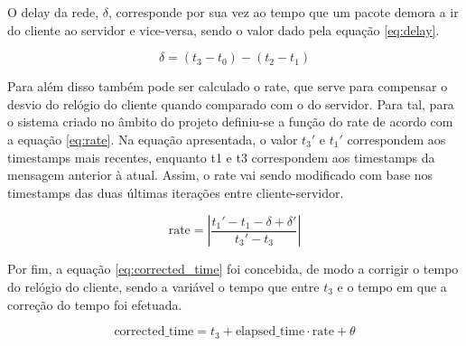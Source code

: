 O delay da rede, $\delta$, corresponde por sua vez ao tempo
que um pacote demora a ir do cliente ao servidor e vice-versa, sendo
o valor dado pela equação \ref{eq:delay}.


\begin{equation} \label{eq:delay}
\delta = (t_{\text{3}} - t_{\text{0}}) - (t_{\text{2}} - t_{\text{1}})
\end{equation}

Para além disso também pode ser calculado o rate, que serve
para compensar o desvio do relógio do cliente quando comparado com o do servidor.
Para tal, para o sistema criado no âmbito do projeto definiu-se a função do
rate de acordo com a equação \ref{eq:rate}. Na equação apresentada,
o valor $t_{\text{3}}'$ e $t_{\text{1}}'$ correspondem aos timestamps 
mais recentes, enquanto t1 e t3 correspondem aos timestamps da mensagem anterior à
atual. Assim, o rate vai sendo modificado com base nos timestamps
das duas últimas iterações entre cliente-servidor.


\begin{equation} \label{eq:rate}
\text{{rate}} =\left| \frac{{t_{\text{1}}' - t_{\text{1}} - \delta + \delta '}}{{t_{\text{3}}' - t_{\text{3}}}} \right|
\end{equation}


Por fim, a equação \ref{eq:corrected_time} foi concebida, de modo a corrigir
o tempo do relógio do cliente, sendo a variável  o tempo
que entre $t_{\text{3}}$ e o tempo em que a correção do tempo foi efetuada.


\begin{equation} \label{eq:corrected_time}
\text{{corrected\_time}} = t_{\text{3}} + \text{{elapsed\_time}} \cdot \text{{rate}} + \theta
\end{equation}



